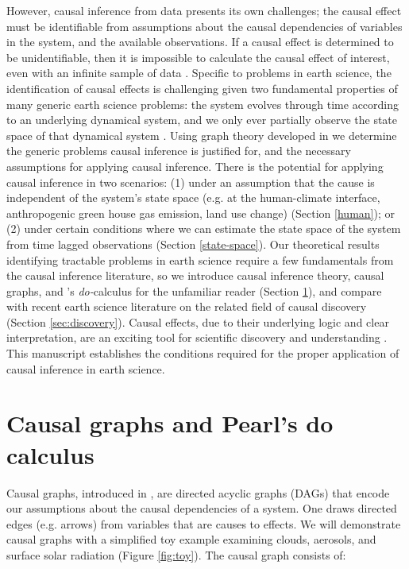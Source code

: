 \documentclass[12pt]{article}
\begin{document}
However, causal inference from data presents its own challenges; the
causal effect must be identifiable from assumptions about the causal
dependencies of variables in the system, and the available
observations. If a causal effect is determined to be unidentifiable,
then it is impossible to calculate the causal effect of interest, even
with an infinite sample of data \citep[][]{shpitser2006}. Specific to
problems in earth science, the identification of causal effects is
challenging given two fundamental properties of many generic earth
science problems: the system evolves through time according to an
underlying dynamical system, and we only ever partially observe the
state space of that dynamical system \citep{majda-state}. Using graph
theory developed in \citep{pearl1995causal} we determine the generic
problems causal inference is justified for, and the necessary
assumptions for applying causal inference. There is the potential for
applying causal inference in two scenarios: (1) under an assumption
that the cause is independent of the system's state space (e.g. at the
human-climate interface, anthropogenic green house gas emission, land
use change) (Section \ref{human}); or (2) under certain conditions
where we can estimate the state space of the system from time lagged
observations (Section \ref{state-space}).  Our theoretical results
identifying tractable problems in earth science require a few
fundamentals from the causal inference literature, so we introduce
causal inference theory, causal graphs, and \citet{pearl2009}'s
\textit{do-}calculus for the unfamiliar reader (Section
\ref{sec:causal-graphs-pearls}), and compare with recent earth science
literature on the related field of causal discovery (Section
\ref{sec:discovery}). Causal effects, due to their underlying logic
and clear interpretation, are an exciting tool for scientific
discovery and understanding \citep{hannart-da,naveau-2020}. This
manuscript establishes the conditions required for the proper
application of causal inference in earth science.

\section{Causal graphs and Pearl's do calculus}
\label{sec:causal-graphs-pearls}

Causal graphs, introduced in \citep{pearl1995causal}, are directed
acyclic graphs (DAGs) that encode our assumptions about the causal
dependencies of a system. One draws directed edges (e.g. arrows) from
variables that are causes to effects. We will demonstrate causal
graphs with a simplified toy example examining clouds, aerosols, and
surface solar radiation (Figure \ref{fig:toy}). The causal graph
consists of:
\end{document}
